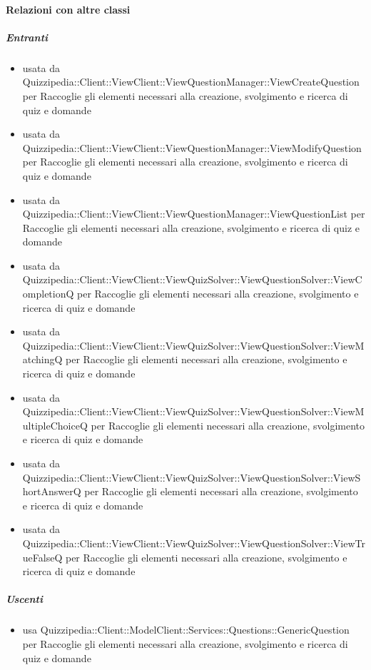 \paragraph{Relazioni con altre classi}
\subparagraph{Entranti}
\begin{itemize}
\item usata da Quizzipedia::Client::ViewClient::ViewQuestionManager::ViewCreateQuestion per Raccoglie gli elementi necessari alla creazione, svolgimento e ricerca di quiz e domande
\item usata da Quizzipedia::Client::ViewClient::ViewQuestionManager::ViewModifyQuestion per Raccoglie gli elementi necessari alla creazione, svolgimento e ricerca di quiz e domande
\item usata da Quizzipedia::Client::ViewClient::ViewQuestionManager::ViewQuestionList per Raccoglie gli elementi necessari alla creazione, svolgimento e ricerca di quiz e domande
\item usata da Quizzipedia::Client::ViewClient::ViewQuizSolver::ViewQuestionSolver::ViewCompletionQ per Raccoglie gli elementi necessari alla creazione, svolgimento e ricerca di quiz e domande
\item usata da Quizzipedia::Client::ViewClient::ViewQuizSolver::ViewQuestionSolver::ViewMatchingQ per Raccoglie gli elementi necessari alla creazione, svolgimento e ricerca di quiz e domande
\item usata da Quizzipedia::Client::ViewClient::ViewQuizSolver::ViewQuestionSolver::ViewMultipleChoiceQ per Raccoglie gli elementi necessari alla creazione, svolgimento e ricerca di quiz e domande
\item usata da Quizzipedia::Client::ViewClient::ViewQuizSolver::ViewQuestionSolver::ViewShortAnswerQ per Raccoglie gli elementi necessari alla creazione, svolgimento e ricerca di quiz e domande
\item usata da Quizzipedia::Client::ViewClient::ViewQuizSolver::ViewQuestionSolver::ViewTrueFalseQ per Raccoglie gli elementi necessari alla creazione, svolgimento e ricerca di quiz e domande
\end{itemize}
\subparagraph{Uscenti}
\begin{itemize}
\item usa Quizzipedia::Client::ModelClient::Services::Questions::GenericQuestion per Raccoglie gli elementi necessari alla creazione, svolgimento e ricerca di quiz e domande
\end{itemize}
